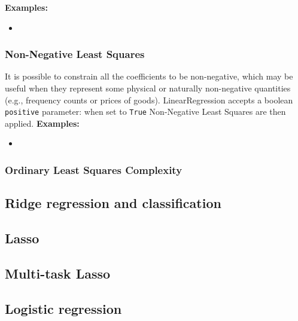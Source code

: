 \textbf{Examples:}
\begin{itemize}
\item {}
\end{itemize}
\subsubsection{Non-Negative Least Squares}
It is possible to constrain all the coefficients to be non-negative, which may be useful when they represent some physical or naturally non-negative quantities (e.g., frequency counts or prices of goods). LinearRegression accepts a boolean \verb|positive| parameter: when set to \verb|True| Non-Negative Least Squares are then applied.
\textbf{Examples:}
\begin{itemize}
\item {}
\end{itemize}

\subsubsection{Ordinary Least Squares Complexity}


\subsection{Ridge regression and classification}
\subsection{Lasso}
\subsection{Multi-task Lasso}

\subsection{Logistic regression\label{Logistic regression}}




